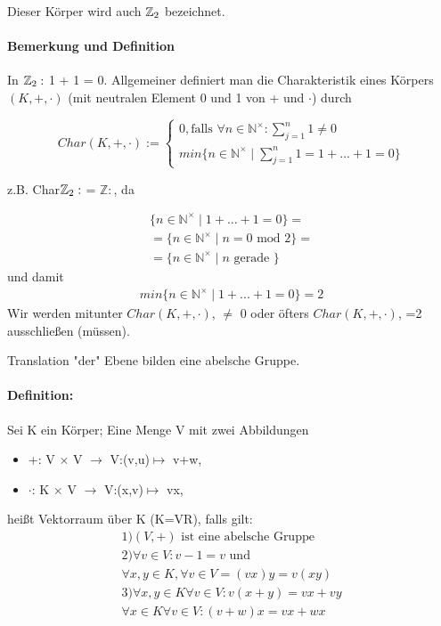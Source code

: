 \documentclass[12pt,a4paper,parskip=half-,DIV=15]{scrartcl}
\begin{document}
Dieser Körper wird auch $\mathbb{Z}\textsubscript{2}$ bezeichnet.

\paragraph{Bemerkung und Definition} In $\mathbb{Z}\textsubscript{2}:$ 1 + 1 = 0. Allgemeiner definiert man die Charakteristik eines Körpers $(K,+,\cdot)$ (mit neutralen Element 0 und 1 von + und $\cdot$) durch

\begin{equation*}
Char(K,+,\cdot):=
\begin{cases}
0,\text{falls } \forall n \in \mathbb{N}^\times: \sum_{j = 1}^{n} 1 \neq 0\\
min\{n \in \mathbb{N}^\times\mid \sum_{j = 1}^{n} 1 = 1+ ... + 1 = 0\}
\end{cases} 
\end{equation*}

z.B. Char$\mathbb{Z}\textsubscript{2}:$ = $\mathbb{Z}:$, da

\begin{align*}
\{n\in\mathbb{N}^\times\mid 1+...+1=0\}=\\
=\{n\in\mathbb{N}^\times\mid n=0 \text{ mod } 2\}=\\
=\{n\in\mathbb{N}^\times\mid n \text{ gerade }\}
\end{align*}
und damit
\begin{align*}
	min\{n\in\mathbb{N}^\times\mid 1+...+1=0\}=2
\end{align*}
Wir werden mitunter $Char(K,+,\cdot)$, $\neq$ 0 oder öfters $Char(K,+,\cdot)$, =2 ausschließen (müssen).

Translation "der" Ebene bilden eine abelsche Gruppe.

\paragraph{Definition:} Sei K ein Körper; Eine Menge V mit zwei Abbildungen

\begin{itemize}
	\item +: V $\times$ V $\to$ V:(v,u)$\mapsto$ v+w,
	\item $\cdot$: K $\times$ V $\to$ V:(x,v)$\mapsto$ vx,
\end{itemize}

heißt Vektorraum über K (K=VR), falls gilt:
\begin{align*}
	1) (V,+) \text{ ist eine abelsche Gruppe}
	\\2) \forall v\in V: v-1=v \text{ und}
	\\	\forall x,y \in K, \forall v\in V= (vx)y = v(xy)
\\	3) \forall x,y \in K \forall v\in V: v(x+y) = vx + vy
	\\	\forall x\in K \forall v\in V: (v+w)x = vx + wx
\end{align*}
\end{document}
